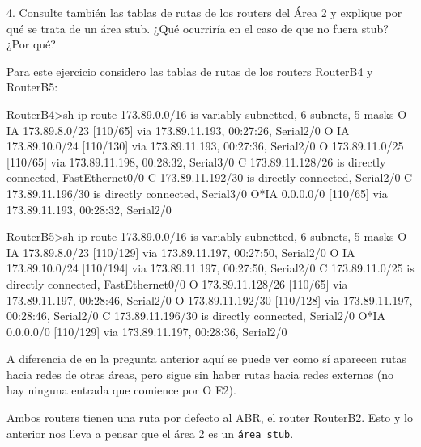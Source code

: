 \begin{ejer}
4. Consulte también las tablas de rutas de los routers del Área 2 y explique por qué se trata de un área stub. ¿Qué ocurriría en el caso de que no fuera stub? ¿Por qué?
\end{ejer}
\par Para este ejercicio considero las tablas de rutas de los routers RouterB4 y RouterB5:
\begin{listing}[style=consola]
RouterB4>sh ip route
     173.89.0.0/16 is variably subnetted, 6 subnets, 5 masks
O IA    173.89.8.0/23 [110/65] via 173.89.11.193, 00:27:26, Serial2/0
O IA    173.89.10.0/24 [110/130] via 173.89.11.193, 00:27:36, Serial2/0
O       173.89.11.0/25 [110/65] via 173.89.11.198, 00:28:32, Serial3/0
C       173.89.11.128/26 is directly connected, FastEthernet0/0
C       173.89.11.192/30 is directly connected, Serial2/0
C       173.89.11.196/30 is directly connected, Serial3/0
O*IA 0.0.0.0/0 [110/65] via 173.89.11.193, 00:28:32, Serial2/0
\end{listing}

\begin{listing}[style=consola]
RouterB5>sh ip route
     173.89.0.0/16 is variably subnetted, 6 subnets, 5 masks
O IA    173.89.8.0/23 [110/129] via 173.89.11.197, 00:27:50, Serial2/0
O IA    173.89.10.0/24 [110/194] via 173.89.11.197, 00:27:50, Serial2/0
C       173.89.11.0/25 is directly connected, FastEthernet0/0
O       173.89.11.128/26 [110/65] via 173.89.11.197, 00:28:46, Serial2/0
O       173.89.11.192/30 [110/128] via 173.89.11.197, 00:28:46, Serial2/0
C       173.89.11.196/30 is directly connected, Serial2/0
O*IA 0.0.0.0/0 [110/129] via 173.89.11.197, 00:28:36, Serial2/0
\end{listing}
\par A diferencia de en la pregunta anterior aquí se puede ver como sí aparecen rutas hacia redes de otras áreas, pero sigue sin haber rutas hacia redes externas (no hay ninguna entrada que comience por O E2).
\par Ambos routers tienen una ruta por defecto al ABR, el router RouterB2. Esto y lo anterior nos lleva a pensar que el área 2 es un \texttt{área stub}.